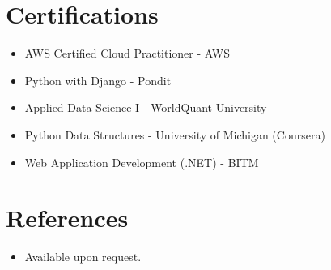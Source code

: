 \documentclass[letterpaper,10pt]{article}
\newcommand{\resumeItem}[1]{\item\small{#1 \vspace{-2pt}}}
\newcommand{\resumeSubHeadingListStart}{\begin{itemize}[leftmargin=0.15in, label={}]}
\newcommand{\resumeSubHeadingListEnd}{\end{itemize}}
\begin{document}
\section{Certifications}
\resumeSubHeadingListStart
  \resumeItem{AWS Certified Cloud Practitioner - AWS}
  \resumeItem{Python with Django - Pondit}
  \resumeItem{Applied Data Science I - WorldQuant University}
  \resumeItem{Python Data Structures - University of Michigan (Coursera)}
  \resumeItem{Web Application Development (.NET) - BITM}
\resumeSubHeadingListEnd

\section{References}
\resumeSubHeadingListStart
  \resumeItem{Available upon request.}
\resumeSubHeadingListEnd
\end{document}
